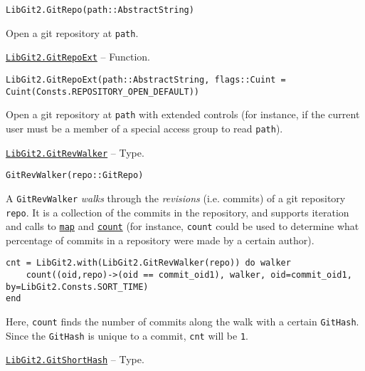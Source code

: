 \begin{adjustwidth}{2em}{0pt}


\begin{verbatim}
LibGit2.GitRepo(path::AbstractString)
\end{verbatim}

Open a git repository at \texttt{path}.



\end{adjustwidth}
\hypertarget{11364757486103041711}{}
\hyperlink{11364757486103041711}{\texttt{LibGit2.GitRepoExt}}  -- {Function.}

\begin{adjustwidth}{2em}{0pt}


\begin{verbatim}
LibGit2.GitRepoExt(path::AbstractString, flags::Cuint = Cuint(Consts.REPOSITORY_OPEN_DEFAULT))
\end{verbatim}

Open a git repository at \texttt{path} with extended controls (for instance, if the current user must be a member of a special access group to read \texttt{path}).



\end{adjustwidth}
\hypertarget{7800294839307043628}{}
\hyperlink{7800294839307043628}{\texttt{LibGit2.GitRevWalker}}  -- {Type.}

\begin{adjustwidth}{2em}{0pt}


\begin{verbatim}
GitRevWalker(repo::GitRepo)
\end{verbatim}

A \texttt{GitRevWalker} \emph{walks} through the \emph{revisions} (i.e. commits) of a git repository \texttt{repo}. It is a collection of the commits in the repository, and supports iteration and calls to \hyperlink{546421066875217314}{\texttt{map}} and \hyperlink{3202007276139600178}{\texttt{count}} (for instance, \texttt{count} could be used to determine what percentage of commits in a repository were made by a certain author).


\begin{verbatim}
cnt = LibGit2.with(LibGit2.GitRevWalker(repo)) do walker
    count((oid,repo)->(oid == commit_oid1), walker, oid=commit_oid1, by=LibGit2.Consts.SORT_TIME)
end
\end{verbatim}

Here, \texttt{count} finds the number of commits along the walk with a certain \texttt{GitHash}. Since the \texttt{GitHash} is unique to a commit, \texttt{cnt} will be \texttt{1}.



\end{adjustwidth}
\hypertarget{3676458372916825224}{}
\hyperlink{3676458372916825224}{\texttt{LibGit2.GitShortHash}}  -- {Type.}

